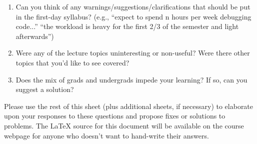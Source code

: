 \begin{enumerate}
\item Can you think of any warnings/suggestions/clarifications that 
should be put in the first-day syllabus? (e.g., ``expect to spend
n hours per week debugging code...''  ``the workload is heavy for
the first 2/3 of the semester and light afterwards'')
\bigskip
\bigskip
\bigskip
\bigskip

\item Were any of the lecture topics uninteresting or non-useful?  Were
there other topics that you'd like to see covered?
\bigskip
\bigskip

\item Does the mix of grads and undergrads impede your learning?
If so, can you suggest a solution?
\bigskip
\bigskip

\end{enumerate}

Please use the rest of this sheet (plus additional sheets, if
necessary) to elaborate upon your responses to these questions and
propose fixes or solutions to problems.  The LaTeX source for this
document will be available on the course webpage for anyone who
doesn't want to hand-write their answers.


